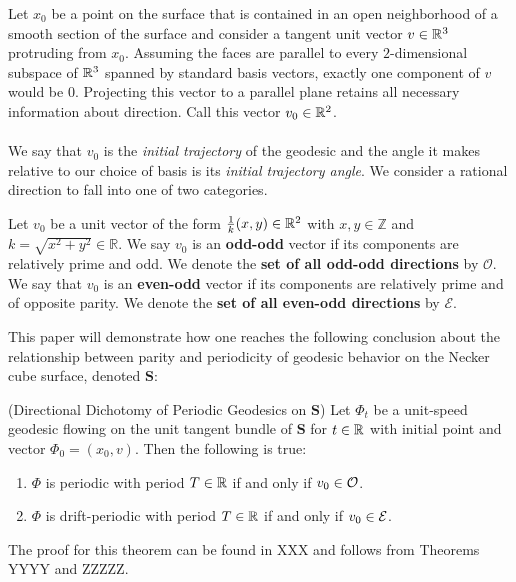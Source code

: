 \documentclass[]{article}
\begin{document}
\begin{figure}

\end{figure}
\noindent Let $x_0$ be a point on the surface that is contained in an open neighborhood of a smooth section of the surface and consider a tangent unit vector $v\in\mathbb{R}^3$ protruding from $x_0$. Assuming the faces are parallel to every $2$-dimensional subspace of $\mathbb{R}^3$ spanned by standard basis vectors, exactly one component of $v$ would be 0. Projecting this vector to a parallel plane retains all necessary information about direction. Call this vector $v_0\in\mathbb{R}^2$.
\\\\
We say that $v_0$ is the \emph{initial trajectory} of the geodesic and the angle it makes relative to our choice of basis is its \emph{initial trajectory angle}. We consider a rational direction to fall into one of two categories.
\begin{Def}
Let $v_0$ be a unit vector of the form $\frac{1}{k}(x,y)\in\mathbb{R}^2$ with $x,y\in\mathbb{Z}$ and $k=\sqrt{x^2+y^2}\in\mathbb{R}$. We say $v_0$ is an \textbf{odd-odd} vector if its components are relatively prime and odd. We denote the \textbf{set of all odd-odd directions} by $\mathcal{O}$. We say that $v_0$ is an \textbf{even-odd} vector if its components are relatively prime and of opposite parity. We denote the \textbf{set of all even-odd directions} by $\mathcal{E}$.
\end{Def}
\noindent This paper will demonstrate how one reaches the following conclusion about the relationship between parity and periodicity of geodesic behavior on the Necker cube surface, denoted $\mathbf{S}$:

\begin{thm*}
(Directional Dichotomy of Periodic Geodesics on $\mathbf{S}$) Let $\Phi_t$ be a unit-speed geodesic flowing on the unit tangent bundle of $\mathbf{S}$ for $t\in\mathbb{R}$ with initial point and vector $\Phi_0=(x_0,v)$. Then the following is true:
\begin{enumerate}[label=(\roman*)]
\item $\Phi$ is periodic with period $T\in\mathbb{R}$ if and only if $v_0\in\mathcal{O}$.
\item $\Phi$ is drift-periodic with period $T\in\mathbb{R}$ if and only if $v_0\in\mathcal{E}$.
\end{enumerate}
\end{thm*}

The proof for this theorem can be found in XXX and follows from Theorems YYYY and ZZZZZ.
\\
\end{document}
